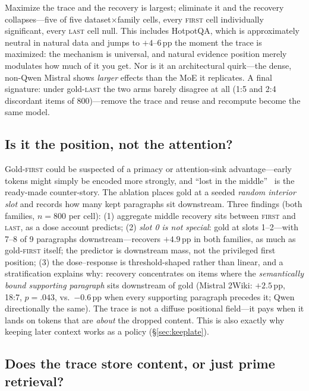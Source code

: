 \documentclass[11pt]{article}
\newcommand{\pp}{\,\mathrm{pp}}
\begin{document}
Maximize the trace and the recovery is largest; eliminate it and the recovery collapses---five of five dataset$\times$family cells, every \textsc{first} cell individually significant, every \textsc{last} cell null. This includes HotpotQA, which is approximately neutral in natural data and jumps to $+4$--$6\pp$ the moment the trace is maximized: the mechanism is universal, and natural evidence position merely modulates how much of it you get. Nor is it an architectural quirk---the dense, non-Qwen Mistral shows \emph{larger} effects than the MoE it replicates. A final signature: under gold-\textsc{last} the two arms barely disagree at all (1:5 and 2:4 discordant items of 800)---remove the trace and reuse and recompute become the same model.

\subsection{Is it the position, not the attention?}
\label{sec:middle}

Gold-\textsc{first} could be suspected of a primacy or attention-sink advantage---early tokens might simply be encoded more strongly, and ``lost in the middle''~\cite{litm} is the ready-made counter-story. The ablation places gold at a seeded \emph{random interior slot} and records how many kept paragraphs sit downstream. Three findings (both families, $n=800$ per cell):
(1) aggregate middle recovery sits between \textsc{first} and \textsc{last}, as a dose account predicts;
(2) \emph{slot 0 is not special}: gold at slots 1--2---with 7--8 of 9 paragraphs downstream---recovers $+4.9\pp$ in both families, as much as gold-\textsc{first} itself; the predictor is downstream mass, not the privileged first position;
(3) the dose--response is threshold-shaped rather than linear, and a stratification explains why: recovery concentrates on items where the \emph{semantically bound supporting paragraph} sits downstream of gold (Mistral 2Wiki: $+2.5\pp$, 18:7, $p{=}.043$, vs.\ $-0.6\pp$ when every supporting paragraph precedes it; Qwen directionally the same). The trace is not a diffuse positional field---it pays when it lands on tokens that are \emph{about} the dropped content. This is also exactly why keeping later context works as a policy (\S\ref{sec:keeplate}).

\subsection{Does the trace store content, or just prime retrieval?}
\label{sec:cf}
\end{document}
